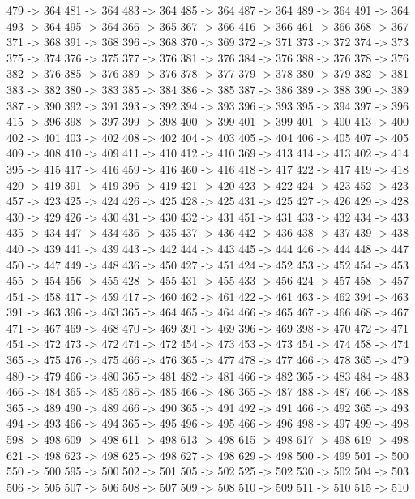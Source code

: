 {	479 -> 364
	481 -> 364
	483 -> 364
	485 -> 364
	487 -> 364
	489 -> 364
	491 -> 364
	493 -> 364
	495 -> 364
	366 -> 365
	367 -> 366
	416 -> 366
	461 -> 366
	368 -> 367
	371 -> 368
	391 -> 368
	396 -> 368
	370 -> 369
	372 -> 371
	373 -> 372
	374 -> 373
	375 -> 374
	376 -> 375
	377 -> 376
	381 -> 376
	384 -> 376
	388 -> 376
	378 -> 376
	382 -> 376
	385 -> 376
	389 -> 376
	378 -> 377
	379 -> 378
	380 -> 379
	382 -> 381
	383 -> 382
	380 -> 383
	385 -> 384
	386 -> 385
	387 -> 386
	389 -> 388
	390 -> 389
	387 -> 390
	392 -> 391
	393 -> 392
	394 -> 393
	396 -> 393
	395 -> 394
	397 -> 396
	415 -> 396
	398 -> 397
	399 -> 398
	400 -> 399
	401 -> 399
	401 -> 400
	413 -> 400
	402 -> 401
	403 -> 402
	408 -> 402
	404 -> 403
	405 -> 404
	406 -> 405
	407 -> 405
	409 -> 408
	410 -> 409
	411 -> 410
	412 -> 410
	369 -> 413
	414 -> 413
	402 -> 414
	395 -> 415
	417 -> 416
	459 -> 416
	460 -> 416
	418 -> 417
	422 -> 417
	419 -> 418
	420 -> 419
	391 -> 419
	396 -> 419
	421 -> 420
	423 -> 422
	424 -> 423
	452 -> 423
	457 -> 423
	425 -> 424
	426 -> 425
	428 -> 425
	431 -> 425
	427 -> 426
	429 -> 428
	430 -> 429
	426 -> 430
	431 -> 430
	432 -> 431
	451 -> 431
	433 -> 432
	434 -> 433
	435 -> 434
	447 -> 434
	436 -> 435
	437 -> 436
	442 -> 436
	438 -> 437
	439 -> 438
	440 -> 439
	441 -> 439
	443 -> 442
	444 -> 443
	445 -> 444
	446 -> 444
	448 -> 447
	450 -> 447
	449 -> 448
	436 -> 450
	427 -> 451
	424 -> 452
	453 -> 452
	454 -> 453
	455 -> 454
	456 -> 455
	428 -> 455
	431 -> 455
	433 -> 456
	424 -> 457
	458 -> 457
	454 -> 458
	417 -> 459
	417 -> 460
	462 -> 461
	422 -> 461
	463 -> 462
	394 -> 463
	391 -> 463
	396 -> 463
	365 -> 464
	465 -> 464
	466 -> 465
	467 -> 466
	468 -> 467
	471 -> 467
	469 -> 468
	470 -> 469
	391 -> 469
	396 -> 469
	398 -> 470
	472 -> 471
	454 -> 472
	473 -> 472
	474 -> 472
	454 -> 473
	453 -> 473
	454 -> 474
	458 -> 474
	365 -> 475
	476 -> 475
	466 -> 476
	365 -> 477
	478 -> 477
	466 -> 478
	365 -> 479
	480 -> 479
	466 -> 480
	365 -> 481
	482 -> 481
	466 -> 482
	365 -> 483
	484 -> 483
	466 -> 484
	365 -> 485
	486 -> 485
	466 -> 486
	365 -> 487
	488 -> 487
	466 -> 488
	365 -> 489
	490 -> 489
	466 -> 490
	365 -> 491
	492 -> 491
	466 -> 492
	365 -> 493
	494 -> 493
	466 -> 494
	365 -> 495
	496 -> 495
	466 -> 496
	498 -> 497
	499 -> 498
	598 -> 498
	609 -> 498
	611 -> 498
	613 -> 498
	615 -> 498
	617 -> 498
	619 -> 498
	621 -> 498
	623 -> 498
	625 -> 498
	627 -> 498
	629 -> 498
	500 -> 499
	501 -> 500
	550 -> 500
	595 -> 500
	502 -> 501
	505 -> 502
	525 -> 502
	530 -> 502
	504 -> 503
	506 -> 505
	507 -> 506
	508 -> 507
	509 -> 508
	510 -> 509
	511 -> 510
	515 -> 510
}
